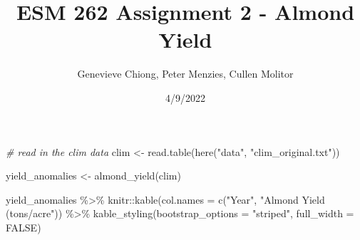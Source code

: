 \documentclass[
]{article}
\title{ESM 262 Assignment 2 - Almond Yield}
\author{Genevieve Chiong, Peter Menzies, Cullen Molitor}
\date{4/9/2022}
\newenvironment{Shaded}{\begin{snugshade}}{\end{snugshade}}
\newcommand{\AttributeTok}[1]{\textcolor[rgb]{0.77,0.63,0.00}{#1}}
\newcommand{\CommentTok}[1]{\textcolor[rgb]{0.56,0.35,0.01}{\textit{#1}}}
\newcommand{\ConstantTok}[1]{\textcolor[rgb]{0.00,0.00,0.00}{#1}}
\newcommand{\FunctionTok}[1]{\textcolor[rgb]{0.00,0.00,0.00}{#1}}
\newcommand{\NormalTok}[1]{#1}
\newcommand{\OtherTok}[1]{\textcolor[rgb]{0.56,0.35,0.01}{#1}}
\newcommand{\SpecialCharTok}[1]{\textcolor[rgb]{0.00,0.00,0.00}{#1}}
\newcommand{\StringTok}[1]{\textcolor[rgb]{0.31,0.60,0.02}{#1}}
\begin{document}
\maketitle

\begin{Shaded}
\begin{Highlighting}[]
\CommentTok{\# read in the clim data }
\NormalTok{clim }\OtherTok{\textless{}{-}} \FunctionTok{read.table}\NormalTok{(}\FunctionTok{here}\NormalTok{(}\StringTok{"data"}\NormalTok{, }\StringTok{"clim\_original.txt"}\NormalTok{))}
\end{Highlighting}
\end{Shaded}

\begin{Shaded}
\begin{Highlighting}[]
\NormalTok{yield\_anomalies }\OtherTok{\textless{}{-}} \FunctionTok{almond\_yield}\NormalTok{(clim) }

\NormalTok{yield\_anomalies }\SpecialCharTok{\%\textgreater{}\%}\NormalTok{ knitr}\SpecialCharTok{::}\FunctionTok{kable}\NormalTok{(}\AttributeTok{col.names =} \FunctionTok{c}\NormalTok{(}\StringTok{"Year"}\NormalTok{,}
                                               \StringTok{"Almond Yield (tons/acre"}\NormalTok{)) }\SpecialCharTok{\%\textgreater{}\%}
  \FunctionTok{kable\_styling}\NormalTok{(}\AttributeTok{bootstrap\_options =} \StringTok{"striped"}\NormalTok{,}
                \AttributeTok{full\_width =} \ConstantTok{FALSE}\NormalTok{)}
\end{Highlighting}
\end{Shaded}
\end{document}
